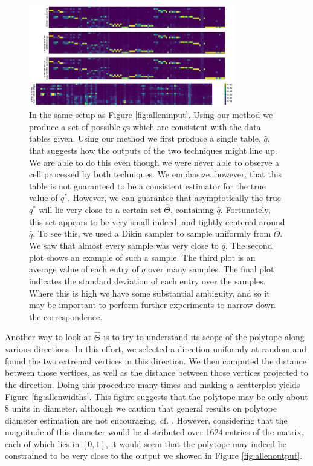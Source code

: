 \begin{figure}
\includegraphics[width=0.8\textwidth]{pics/allenavg}
\caption{\label{fig:allenoutput}In the same setup as Figure \ref{fig:alleninput}.  Using our method we produce a set of possible $q$s which are consistent with the data tables given.   Using our method we first produce a single table, $\hat q$, that suggests how the outputs of the two techniques might line up.  We are able to do this even though we were never able to observe a cell processed by both techniques.    We emphasize, however, that this table is not guaranteed to be a consistent estimator for the true value of $q^*$.  However, we can guarantee that asymptotically the true $q^*$ will lie very close to a certain set $\hat \Theta$, containing $\hat q$. Fortunately, this set appears to be very small indeed, and tightly centered around $\hat q$.  To see this, we used a Dikin sampler to sample uniformly from $\hat \Theta$.  We saw that almost every sample was very close to $\hat q$.  The second plot shows an example of such a sample.  The third plot is an average value of each entry of $q$ over many samples.  The final plot indicates the standard deviation of each entry over the samples.  Where this is high we have some substantial ambiguity, and so it may be important to perform further experiments to narrow down the correspondence.  \label{fig:allenavg}}
\end{figure}

Another way to look at $\hat \Theta$ is to try to understand its scope of the polytope along various directions.  In this effort, we selected a direction uniformly at random and found the two extremal vertices in this direction.  We then computed the distance between those vertices, as well as the distance between those vertices projected to the direction.  Doing this procedure many times and making a scatterplot yields Figure \ref{fig:allenwidths}.  This figure suggests that the polytope may be only about 8 units in diameter, although we caution that general results on polytope diameter estimation are not encouraging, cf. \citep{brieden1998approximation}.  However, considering that the magnitude of this diameter would be distributed over 1624 entries of the matrix, each of which lies in $[0,1]$, it would seem that the polytope may indeed be constrained to be very close to the output we showed in Figure \ref{fig:allenoutput}.

